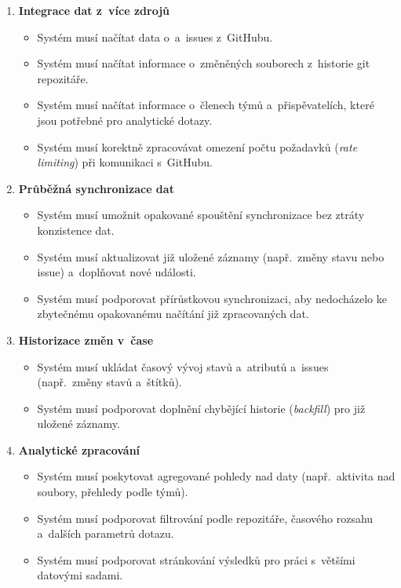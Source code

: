 \begin{enumerate}
  \item \textbf{Integrace dat z~více zdrojů}
    \begin{itemize}
      \item Systém musí načítat data o~\PR a~issues z~\API GitHubu.
      \item Systém musí načítat informace o~změněných souborech z~historie git repozitáře.
      \item Systém musí načítat informace o~členech týmů a~přispěvatelích, které jsou potřebné pro analytické dotazy.
      \item Systém musí korektně zpracovávat omezení počtu požadavků (\emph{rate limiting}) při komunikaci s~\API GitHubu.
    \end{itemize}

  \item \textbf{Průběžná synchronizace dat}
    \begin{itemize}
      \item Systém musí umožnit opakované spouštění synchronizace bez ztráty konzistence dat.
      \item Systém musí aktualizovat již uložené záznamy (např.\ změny stavu \PR nebo issue) a~doplňovat nové události.
      \item Systém musí podporovat přírůstkovou synchronizaci, aby nedocházelo ke zbytečnému opakovanému načítání již zpracovaných dat.
    \end{itemize}

  \item \textbf{Historizace změn v~čase}
    \begin{itemize}
      \item Systém musí ukládat časový vývoj stavů a~atributů \PR a~issues (např.\ změny stavů a~štítků).
      \item Systém musí podporovat doplnění chybějící historie (\emph{backfill}) pro již uložené záznamy.
    \end{itemize}

  \item \textbf{Analytické zpracování}
    \begin{itemize}
      \item Systém musí poskytovat agregované pohledy nad daty (např.\ aktivita nad soubory, přehledy podle týmů).
      \item Systém musí podporovat filtrování podle repozitáře, časového rozsahu a~dalších parametrů dotazu.
      \item Systém musí podporovat stránkování výsledků pro práci s~většími datovými sadami.
    \end{itemize}


\end{enumerate}

